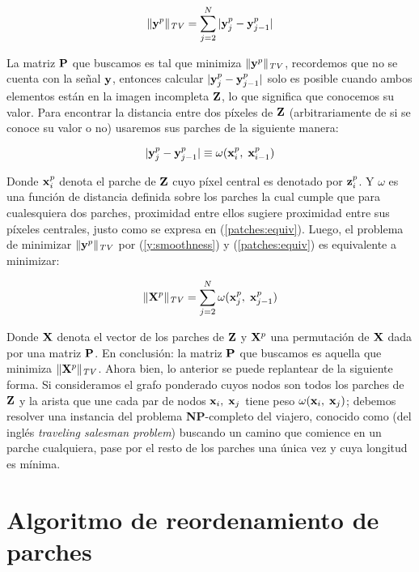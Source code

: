 \begin{equation}
\|\y^p\|_{\mathit{TV}} = \sum_{j = 2}^{N}|\y_j^{p} - \y_{j - 1}^{p}|
\label{y:smoothness}
\end{equation}

La matriz $\P$ que buscamos es tal que minimiza $\|\y^p\|_{\mathit{TV}}$, recordemos que no se cuenta con la señal  $\y$, entonces calcular $|\y_j^{p} - \y_{j - 1}^{p}|$ solo es posible cuando ambos elementos est\'an en la imagen incompleta $\Z$, lo que significa que conocemos su valor. Para encontrar la distancia entre dos p\'ixeles de $\Z$ (arbitrariamente de si se conoce su valor o no) usaremos sus parches de la siguiente manera:

\begin{equation}
|\y_j^{p} - \y_{j - 1}^{p}| \equiv \omega(\x_i^p,\; \x_{i - 1}^p)
\label{patches:equiv}
\end{equation}

Donde $\x_i^p$ denota el parche de $\Z$ cuyo p\'ixel central es denotado por $\z_i^p$. Y $\omega$ es una funci\'on de distancia definida sobre los parches la cual cumple que para cualesquiera dos parches, proximidad entre ellos sugiere proximidad entre sus p\'ixeles centrales, justo como se expresa en (\ref{patches:equiv}). Luego, el problema de minimizar $\|\y^p\|_{\mathit{TV}}$ por (\ref{y:smoothness}) y (\ref{patches:equiv}) es equivalente a minimizar:

\begin{equation}
\|\X^p\|_{\mathit{TV}} = \sum_{j = 2}^{N}\omega(\x_j^{p},\; \x_{j - 1}^{p})
\end{equation}

Donde $\X$ denota el vector de los parches de $\Z$ y $\X^p$ una permutaci\'on de $\X$ dada por una matriz $\P$. En conclusi\'on: la matriz $\P$ que buscamos es aquella  que minimiza $\|\X^p\|_{\mathit{TV}}$. Ahora bien, lo anterior se puede replantear de la siguiente forma. Si consideramos el grafo ponderado cuyos nodos son todos los parches de $\Z$ y la arista que une cada par de nodos $\x_i,\;\x_j$ tiene peso $\omega(\x_i,\; \x_j)$; debemos resolver una instancia del problema \textbf{NP}-completo del viajero, conocido como \TSP (del ingl\'es \textit{traveling salesman problem}) buscando un camino que comience en un parche cualquiera, pase por el resto de los parches una \'unica vez y cuya longitud es m\'inima.

\section{Algoritmo de reordenamiento de parches}


